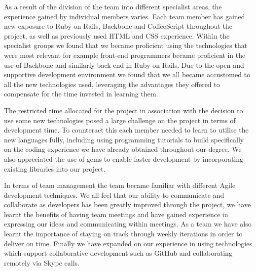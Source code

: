 		As a result of the division of the team into different specialist areas, the experience gained by individual members varies. Each team member has gained new exposure to Ruby on Rails, Backbone and CoffeeScript throughout the project, as well as previously used HTML and CSS experience. Within the specialist groups we found that we became proficient using the technologies that were most relevant for example front-end programmers became proficient in the use of Backbone and similarly back-end in Ruby on Rails. Due to the open and supportive development environment we found that we all became accustomed to all the new technologies used, leveraging the advantages they offered to compensate for the time invested in learning them.

		The restricted time allocated for the project in association with the decision to use some new technologies posed a large challenge on the project in terms of development time. To counteract this each member needed to learn to utilise the new languages fully, including using programming tutorials to build specifically on the coding experience we have already obtained throughout our degree. We also appreciated the use of gems to enable faster development by incorporating existing libraries into our project. 

		In terms of team management the team became familiar with different Agile development techniques. We all feel that our ability to communicate and collaborate as developers has been greatly improved through the project, we have learnt the benefits of having team meetings and have gained experience in expressing our ideas and communicating within meetings. As a team we have also learnt the importance of staying on track through weekly iterations in order to deliver on time. Finally we have expanded on our experience in using technologies which support collaborative development such as GitHub and collaborating remotely via Skype calls.
